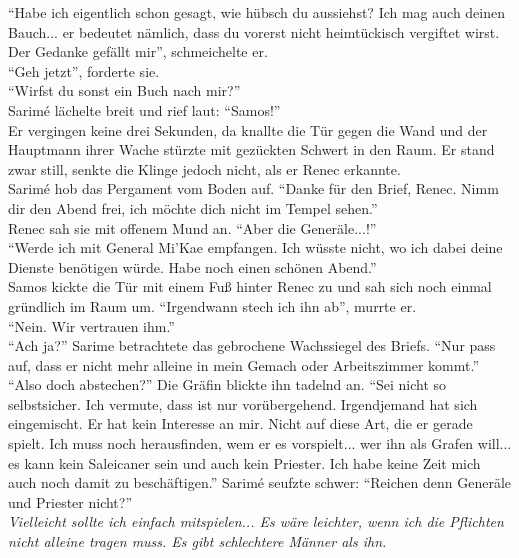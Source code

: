 ``Habe ich eigentlich schon gesagt, wie hübsch du aussiehst? Ich mag auch deinen Bauch... er 
bedeutet nämlich, dass du vorerst nicht heimtückisch vergiftet wirst. Der Gedanke gefällt mir'', 
schmeichelte er.\\
``Geh jetzt'', forderte sie.\\
``Wirfst du sonst ein Buch nach mir?''\\
Sarimé lächelte breit und rief laut: ``Samos!''\\
Er vergingen keine drei Sekunden, da knallte die Tür gegen die Wand und der Hauptmann ihrer Wache 
stürzte mit gezückten Schwert in den Raum. Er stand zwar still, senkte die Klinge jedoch nicht, als 
er Renec erkannte.\\
Sarimé hob das Pergament vom Boden auf. ``Danke für den Brief, Renec. Nimm dir den Abend frei, ich 
möchte dich nicht im Tempel sehen.''\\
Renec sah sie mit offenem Mund an. ``Aber die Generäle...!''\\
``Werde ich mit General Mi'Kae empfangen. Ich wüsste nicht, wo ich dabei deine Dienste benötigen 
würde. Habe noch einen schönen Abend.''\\
Samos kickte die Tür mit einem Fuß hinter Renec zu und sah sich noch einmal gründlich im Raum um. 
``Irgendwann stech ich ihn ab'', murrte er.\\
``Nein. Wir vertrauen ihm.''\\
``Ach ja?''
Sarime betrachtete das gebrochene Wachssiegel des Briefs. ``Nur pass auf, dass er nicht mehr 
alleine in mein Gemach oder Arbeitszimmer kommt.''\\
``Also doch abstechen?''
Die Gräfin blickte ihn tadelnd an. ``Sei nicht so selbstsicher. Ich vermute, dass ist nur 
vorübergehend. Irgendjemand hat sich eingemischt. Er hat kein Interesse an mir. Nicht auf diese 
Art, die er gerade spielt. Ich muss noch herausfinden, wem er es vorspielt... wer ihn als Grafen 
will... es kann kein Saleicaner sein und auch kein Priester. Ich habe keine Zeit mich auch noch 
damit zu beschäftigen.'' Sarimé seufzte schwer: ``Reichen denn Generäle und Priester nicht?''\\
\textit{Vielleicht sollte ich einfach mitspielen... Es wäre leichter, wenn ich die Pflichten nicht 
alleine tragen muss. Es gibt schlechtere Männer als ihn.}\\

